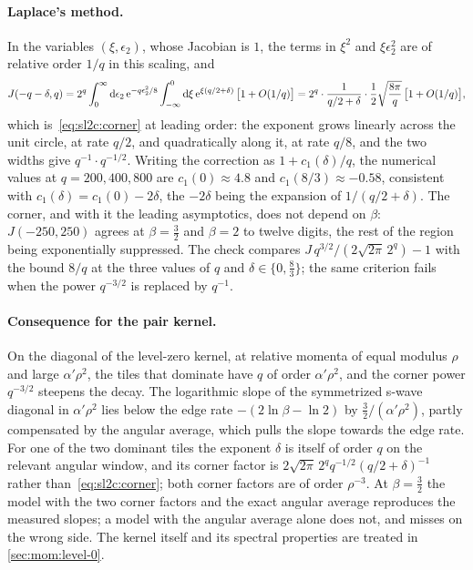 \paragraph{Laplace's method.}
In the variables $(\xi, \epsilon_2)$, whose Jacobian is $1$, the terms in $\xi^2$ and $\xi \epsilon_2^2$ are of relative order $1 / q$ in this scaling, and
\begin{equation}
  J(- q - \delta, q)
    = 2^q \int_0^\infty \mathrm{d} \epsilon_2 \, \mathrm{e}^{- q \epsilon_2^2 / 8} \int_{- \infty}^0 \mathrm{d} \xi \, \mathrm{e}^{\xi (q / 2 + \delta)} \, \big[ 1 + O(1 / q) \big]
    = 2^q \cdot \frac{1}{q / 2 + \delta} \cdot \frac{1}{2} \sqrt{\frac{8 \pi}{q}} \, \big[ 1 + O(1 / q) \big],
\end{equation}
which is~\eqref{eq:sl2c:corner} at leading order: the exponent grows linearly across the unit circle, at rate $q / 2$, and quadratically along it, at rate $q / 8$, and the two widths give $q^{-1} \cdot q^{-1/2}$.
Writing the correction as $1 + c_1(\delta) / q$, the numerical values at $q = 200, 400, 800$ are $c_1(0) \approx 4.8$ and $c_1(8/3) \approx - 0.58$, consistent with $c_1(\delta) = c_1(0) - 2 \delta$, the $- 2 \delta$ being the expansion of $1 / (q / 2 + \delta)$.
The corner, and with it the leading asymptotics, does not depend on $\beta$: $J(-250, 250)$ agrees at $\beta = \frac{3}{2}$ and $\beta = 2$ to twelve digits, the rest of the region being exponentially suppressed.
The check compares $J \, q^{3/2} / (2 \sqrt{2 \pi} \, 2^q) - 1$ with the bound $8 / q$ at the three values of $q$ and $\delta \in \{ 0, \frac{8}{3} \}$; the same criterion fails when the power $q^{-3/2}$ is replaced by $q^{-1}$.

\paragraph{Consequence for the pair kernel.}
On the diagonal of the level-zero kernel, at relative momenta of equal modulus $\rho$ and large $\alpha' \rho^2$, the tiles that dominate have $q$ of order $\alpha' \rho^2$, and the corner power $q^{-3/2}$ steepens the decay.
The logarithmic slope of the symmetrized s-wave diagonal in $\alpha' \rho^2$ lies below the edge rate $- (2 \ln \beta - \ln 2)$ by $\frac{3}{2} / (\alpha' \rho^2)$, partly compensated by the angular average, which pulls the slope towards the edge rate.
For one of the two dominant tiles the exponent $\delta$ is itself of order $q$ on the relevant angular window, and its corner factor is $2 \sqrt{2 \pi} \, 2^q q^{-1/2} (q / 2 + \delta)^{-1}$ rather than~\eqref{eq:sl2c:corner}; both corner factors are of order $\rho^{-3}$.
At $\beta = \frac{3}{2}$ the model with the two corner factors and the exact angular average reproduces the measured slopes; a model with the angular average alone does not, and misses on the wrong side.
The kernel itself and its spectral properties are treated in \cref{sec:mom:level-0}.

